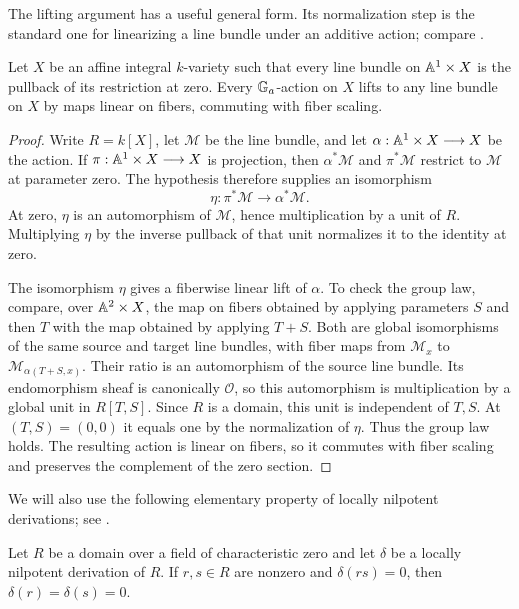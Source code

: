 The lifting argument has a useful general form.  Its normalization step
is the standard one for linearizing a line bundle under an additive action;
compare \cite[Lemma~2.9]{Brion2015}.

\begin{lemma}\label{bun:action-lift}
Let $X$ be an affine integral $k$-variety such that every line bundle on
$\mathbb A^1\times X$ is the pullback of its restriction at zero.  Every
$\mathbb G_a$-action on $X$ lifts to any line bundle on $X$ by maps linear on
fibers, commuting with fiber scaling.
\end{lemma}

\begin{proof}
Write $R=k[X]$, let $\mathcal M$ be the line bundle, and let
$\alpha:\mathbb A^1\times X\longrightarrow X$ be the action.  If
$\pi:\mathbb A^1\times X\longrightarrow X$ is projection, then
$\alpha^*\mathcal M$ and $\pi^*\mathcal M$ restrict to $\mathcal M$ at
parameter zero.  The hypothesis therefore supplies an isomorphism
\[
 \eta:\pi^*\mathcal M\longrightarrow\alpha^*\mathcal M.
\]
At zero, $\eta$ is an automorphism of $\mathcal M$, hence multiplication
by a unit of $R$.  Multiplying $\eta$ by the inverse pullback of that unit
normalizes it to the identity at zero.

The isomorphism $\eta$ gives a fiberwise linear lift of $\alpha$.  To check
the group law, compare, over $\mathbb A^2\times X$, the map on fibers obtained
by applying parameters $S$ and then $T$ with the map obtained by applying
$T+S$.  Both are global isomorphisms of the same source and target line bundles,
with fiber maps from $\mathcal M_x$ to
$\mathcal M_{\alpha(T+S,x)}$.  Their ratio is an automorphism of the source
line bundle.  Its endomorphism sheaf is canonically $\mathcal O$, so this
automorphism is multiplication by a global unit in $R[T,S]$.
Since $R$ is a domain, this unit is independent of $T,S$.  At $(T,S)=(0,0)$
it equals one by the normalization of $\eta$.  Thus the group law holds.
The resulting action is linear on fibers, so it commutes with fiber
scaling and preserves the complement of the zero section.
\end{proof}

We will also use the following elementary property of locally nilpotent
derivations; see \cite[Proposition~2.1(3)]{KalimanMakarLimanov2007}.

\begin{lemma}\label{bun:factorial-closure}
Let $R$ be a domain over a field of characteristic zero and let $\delta$ be a locally
nilpotent derivation of $R$.  If $r,s\in R$ are nonzero and $\delta(rs)=0$,
then $\delta(r)=\delta(s)=0$.
\end{lemma}

